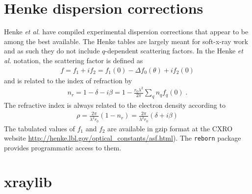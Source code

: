 \documentclass[11pt]{article}
\begin{document}
\section{Henke dispersion corrections} 

Henke {\itshape et al.}\cite{henkeXRayInteractionsPhotoabsorption1993} have compiled experimental dispersion corrections
that appear to be among the best available.  The Henke tables are largely meant for soft-x-ray work and as such they do
not include $q$-dependent scattering factors.
In the Henke {\itshape et al.}\cite{henkeXRayInteractionsPhotoabsorption1993} notation, the scattering factor is defined
as
\begin{align}
f=f_1+if_2=f_1(0)-\Delta f_0(\theta)+if_2(0)
\end{align}
and is related to the index of refraction by
\begin{align}
n_r = 1 - \delta -i\beta = 1 -\frac{r_0\lambda^2}{2\pi}\sum_q n_qf_q(0) \; .
\end{align}
The refractive index is always related to the electron density according to
\begin{align}
\rho =  \frac{2\pi}{\lambda^2 r_0 } \left( 1 - n_r \right) = \frac{2\pi}{\lambda^2 r_0 } \left( \delta + i \beta \right) 
\end{align}
The tabulated values of $f_1$ and $f_2$ are available in gzip format at the CXRO website
\url{http://henke.lbl.gov/optical_constants/asf.html}).  The \texttt{reborn} package provides programmatic access to
them.


\section{xraylib}
\end{document}
